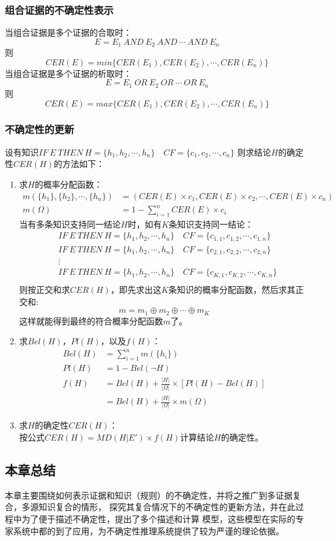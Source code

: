 \documentclass[12pt]{article}
\begin{document}
\subsubsection{组合证据的不确定性表示}
当组合证据是多个证据的合取时：
\[
	E=E_1\ AND\ E_2\ AND\ \cdots\ AND\ E_n
\]
则
\[
	CER(E)=min\{CER(E_1),CER(E_2),\cdots,CER(E_n)\}
\]
当组合证据是多个证据的析取时：
\[
	E=E_1\ OR\ E_2\ OR\ \cdots\ OR\ E_n
\]
则
\[
	CER(E)=max\{CER(E_1),CER(E_2),\cdots,CER(E_n)\}
\]
\subsubsection{不确定性的更新}
设有知识$IF\ E\ THEN\ H=\{h_1,h_2,\cdots,h_n\}\quad CF=\{c_1,c_2,\cdots,c_n\}$
则求结论$H$的确定性$CER(H)$的方法如下：
\begin{enumerate}
	\item 求$H$的概率分配函数：
	\[
		\begin{aligned}
			m(\{h_1\},\{h_2\},\cdots,\{h_n\})
			&=(CER(E)\times c_1,CER(E)\times c_2, 
			\cdots, CER(E)\times c_n)\\
			m(\Omega)&=1-\sum\limits_{i=1}^n CER(E)\times c_i
		\end{aligned}
	\]
	当有多条知识支持同一结论$H$时，如有$K$条知识支持同一结论：
	\[
		\begin{aligned}
			&IF\ E\ THEN\ H=\{h_1,h_2,\cdots,h_n\}\quad 
			CF=\{c_{1,1},c_{1,2},\cdots,c_{1,n}\}\\
			&IF\ E\ THEN\ H=\{h_1,h_2,\cdots,h_n\}\quad 
			CF=\{c_{2,1},c_{2,2},\cdots,c_{2,n}\}\\
			&\vdots\\
			&IF\ E\ THEN\ H=\{h_1,h_2,\cdots,h_n\}\quad 
			CF=\{c_{K,1},c_{K,2},\cdots,c_{K,n}\}\\
		\end{aligned}	
	\]
	则按正交和求$CER(H)$，即先求出这$K$条知识的概率分配函数，然后求其正交和:
	\[m=m_1\oplus m_2\oplus\cdots\oplus m_K\]
	这样就能得到最终的符合概率分配函数$m$了。
	\item 求$Bel(H)$，$Pl(H)$，以及$f(H)$：
	\[
		\begin{aligned}
			Bel(H)&=\sum\limits_{i=1}^n m(\{h_i\})\\
			Pl(H)&=1-Bel(\neg H)\\
			f(H)&=Bel(H)+\frac{|H|}{|\Omega|}\times [Pl(H)-Bel(H)]\\
			&=Bel(H)+\frac{|H|}{|\Omega|}\times m(\Omega)
		\end{aligned}
	\]
	\item 求$H$的确定性$CER(H)$：\\
	按公式$CER(H)=MD(H|E')\times f(H)$计算结论$H$的确定性。
	
\end{enumerate}
\subsection{本章总结}
本章主要围绕如何表示证据和知识（规则）的不确定性，并将之推广到多证据复合，多源知识复合的情形，
探究其复合情况下的不确定性的更新方法，并在此过程中为了便于描述不确定性，提出了多个描述和计算
模型，这些模型在实际的专家系统中都的到了应用，为不确定性推理系统提供了较为严谨的理论依据。
\end{document}
